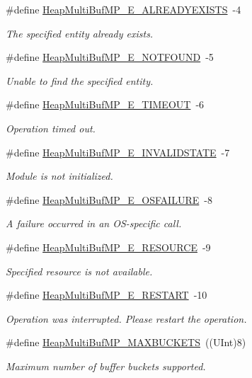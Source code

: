 \begin{DoxyCompactItemize}
\#define \hyperlink{_heap_multi_buf_m_p_8h_aa4a386a0533dcea1f4da27467fc57d1e}{Heap\-Multi\-Buf\-M\-P\-\_\-\-E\-\_\-\-A\-L\-R\-E\-A\-D\-Y\-E\-X\-I\-S\-T\-S}~-\/4
\begin{DoxyCompactList}\small\item\em The specified entity already exists. \end{DoxyCompactList}\item 
\#define \hyperlink{_heap_multi_buf_m_p_8h_a9e65df2b0c5a166d3d38530d191f14d1}{Heap\-Multi\-Buf\-M\-P\-\_\-\-E\-\_\-\-N\-O\-T\-F\-O\-U\-N\-D}~-\/5
\begin{DoxyCompactList}\small\item\em Unable to find the specified entity. \end{DoxyCompactList}\item 
\#define \hyperlink{_heap_multi_buf_m_p_8h_a6ad1a9ffb91f75d79919732c5de78e63}{Heap\-Multi\-Buf\-M\-P\-\_\-\-E\-\_\-\-T\-I\-M\-E\-O\-U\-T}~-\/6
\begin{DoxyCompactList}\small\item\em Operation timed out. \end{DoxyCompactList}\item 
\#define \hyperlink{_heap_multi_buf_m_p_8h_af631aca7140763ec034bd45fdc5f4d73}{Heap\-Multi\-Buf\-M\-P\-\_\-\-E\-\_\-\-I\-N\-V\-A\-L\-I\-D\-S\-T\-A\-T\-E}~-\/7
\begin{DoxyCompactList}\small\item\em Module is not initialized. \end{DoxyCompactList}\item 
\#define \hyperlink{_heap_multi_buf_m_p_8h_a72ae1d6fe31a65ae7064197fa66229fc}{Heap\-Multi\-Buf\-M\-P\-\_\-\-E\-\_\-\-O\-S\-F\-A\-I\-L\-U\-R\-E}~-\/8
\begin{DoxyCompactList}\small\item\em A failure occurred in an O\-S-\/specific call. \end{DoxyCompactList}\item 
\#define \hyperlink{_heap_multi_buf_m_p_8h_a48d5b8e442db63bee46fd6984a321639}{Heap\-Multi\-Buf\-M\-P\-\_\-\-E\-\_\-\-R\-E\-S\-O\-U\-R\-C\-E}~-\/9
\begin{DoxyCompactList}\small\item\em Specified resource is not available. \end{DoxyCompactList}\item 
\#define \hyperlink{_heap_multi_buf_m_p_8h_a1bdbda42d7389cd53338729ca3804851}{Heap\-Multi\-Buf\-M\-P\-\_\-\-E\-\_\-\-R\-E\-S\-T\-A\-R\-T}~-\/10
\begin{DoxyCompactList}\small\item\em Operation was interrupted. Please restart the operation. \end{DoxyCompactList}\item 
\#define \hyperlink{_heap_multi_buf_m_p_8h_adf1fa817a6a12132b7293ec1fc1c8bf4}{Heap\-Multi\-Buf\-M\-P\-\_\-\-M\-A\-X\-B\-U\-C\-K\-E\-T\-S}~((U\-Int)8)
\begin{DoxyCompactList}\small\item\em Maximum number of buffer buckets supported. \end{DoxyCompactList}\end{DoxyCompactItemize}
